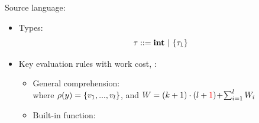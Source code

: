 \documentclass{beamer}
\begin{document}
\begin{frame}{Source language: {\fmsnesl}}
\begin{itemize}
	\item Types: $$\tau ::= \int \ | \ \tseq{\tau_1}$$
 	\item Key evaluation rules with work cost,  : \\
 	\begin{itemize}
 	\item General comprehension: \\[1ex]
  where $\rho(y)=\{\replc{l}{v}\}$, and $W =  (k+1)\cdot (l+ {\color{red}1}) \!+\!\sum_{i=1}^{l}W_i $ \\[2ex]
  
   \item Built-in function: 
	\end{itemize}
\end{itemize}
\end{frame}
\end{document}
